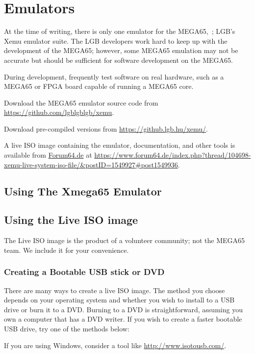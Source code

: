 \chapter{Emulators}

At the time of writing, there is only one emulator for the MEGA65,\ ; LGB's Xemu emulator suite. The LGB developers work hard to keep up with the development of the MEGA65; however, some MEGA65 emulation may not be accurate but should be sufficient for software development on the MEGA65.


During development, frequently test software on real hardware, such as a MEGA65 or FPGA board capable of running a MEGA65 core.

Download the MEGA65 emulator source code from \url{https://github.com/lgblgblgb/xemu}.

Download pre-compiled versions from \url{https://github.lgb.hu/xemu/}.

A live ISO image containing the emulator, documentation, and other tools is available from \url{Forum64.de}
at \url{https://www.forum64.de/index.php?thread/104698-xemu-live-system-iso-file/\&postID=1549927\#post1549936}.

\section{Using The Xmega65 Emulator}

\section{Using the Live ISO image}

The Live ISO image is the product of a volunteer community; not the MEGA65 team. We include it for your convenience.

\subsection{Creating a Bootable USB stick or DVD}

There are many ways to create a live ISO image. The method you choose depends on your operating system and whether you wish to install to a USB drive or burn it to a DVD. Burning to a DVD is straightforward, assuming you own a computer that has a DVD writer. If you wish to create a faster bootable USB drive, try one of the methods below:

If you are using Windows, consider a tool like \url{http://www.isotousb.com/}.

